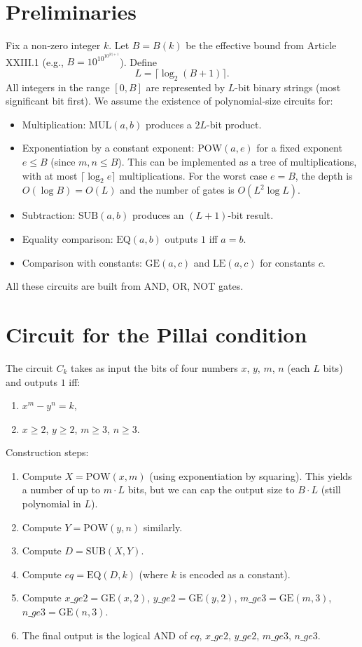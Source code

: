 \documentclass[11pt,a4paper]{article}
\begin{document}
\section{Preliminaries}

Fix a non‑zero integer $k$. Let $B = B(k)$ be the effective bound from Article XXIII.1 (e.g., $B = 10^{10^{10^{|k|+1}}}$). Define
\[
L = \lceil \log_2(B+1)\rceil.
\]
All integers in the range $[0,B]$ are represented by $L$-bit binary strings (most significant bit first). We assume the existence of polynomial‑size circuits for:
\begin{itemize}
\item Multiplication: $\mathrm{MUL}(a,b)$ produces a $2L$-bit product.
\item Exponentiation by a constant exponent: $\mathrm{POW}(a,e)$ for a fixed exponent $e \le B$ (since $m,n \le B$). This can be implemented as a tree of multiplications, with at most $\lceil \log_2 e\rceil$ multiplications. For the worst case $e=B$, the depth is $O(\log B) = O(L)$ and the number of gates is $O(L^2 \log L)$.
\item Subtraction: $\mathrm{SUB}(a,b)$ produces an $(L+1)$-bit result.
\item Equality comparison: $\mathrm{EQ}(a,b)$ outputs $1$ iff $a=b$.
\item Comparison with constants: $\mathrm{GE}(a, c)$ and $\mathrm{LE}(a, c)$ for constants $c$.
\end{itemize}
All these circuits are built from AND, OR, NOT gates.

\section{Circuit for the Pillai condition}

The circuit $C_k$ takes as input the bits of four numbers $x$, $y$, $m$, $n$ (each $L$ bits) and outputs $1$ iff:
\begin{enumerate}
\item $x^m - y^n = k$,
\item $x \ge 2$, $y \ge 2$, $m \ge 3$, $n \ge 3$.
\end{enumerate}

Construction steps:
\begin{enumerate}
\item Compute $X = \mathrm{POW}(x, m)$ (using exponentiation by squaring). This yields a number of up to $m \cdot L$ bits, but we can cap the output size to $B \cdot L$ (still polynomial in $L$).
\item Compute $Y = \mathrm{POW}(y, n)$ similarly.
\item Compute $D = \mathrm{SUB}(X, Y)$.
\item Compute $eq = \mathrm{EQ}(D, k)$ (where $k$ is encoded as a constant).
\item Compute $x\_ge2 = \mathrm{GE}(x, 2)$, $y\_ge2 = \mathrm{GE}(y, 2)$, $m\_ge3 = \mathrm{GE}(m, 3)$, $n\_ge3 = \mathrm{GE}(n, 3)$.
\item The final output is the logical AND of $eq$, $x\_ge2$, $y\_ge2$, $m\_ge3$, $n\_ge3$.
\end{enumerate}
\end{document}
